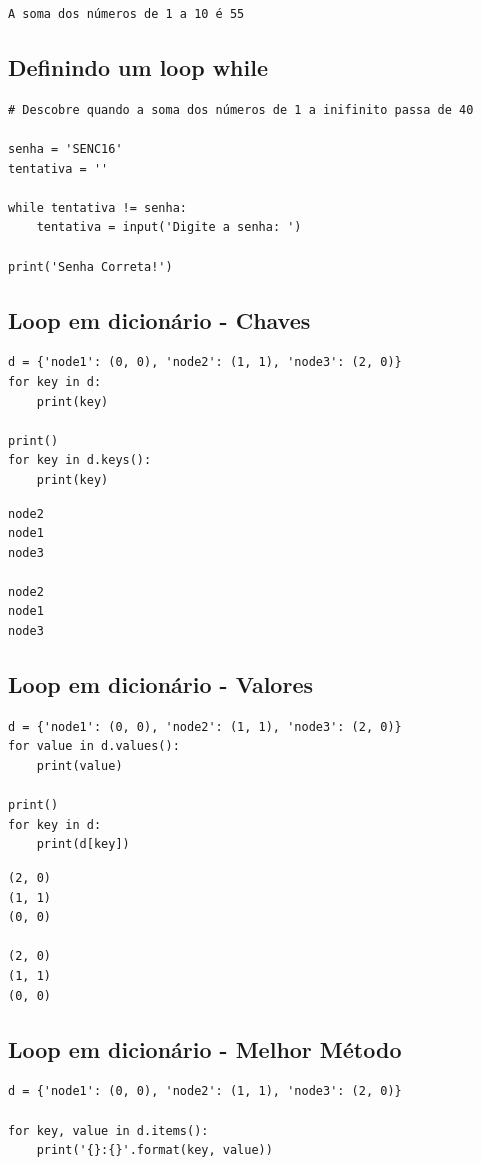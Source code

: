 \documentclass[presentation]{beamer}
\begin{document}
\begin{verbatim}
A soma dos números de 1 a 10 é 55
\end{verbatim}

\subsection{Definindo um loop while}
\label{sec:orgheadline80}
\begin{verbatim}
# Descobre quando a soma dos números de 1 a inifinito passa de 40

senha = 'SENC16'
tentativa = ''

while tentativa != senha: 
    tentativa = input('Digite a senha: ')

print('Senha Correta!')
\end{verbatim}
\subsection{Loop em dicionário - Chaves}
\label{sec:orgheadline81}
\begin{verbatim}
d = {'node1': (0, 0), 'node2': (1, 1), 'node3': (2, 0)}
for key in d:
    print(key)

print()
for key in d.keys():
    print(key)
\end{verbatim}

\begin{verbatim}
node2
node1
node3

node2
node1
node3
\end{verbatim}
\subsection{Loop em dicionário - Valores}
\label{sec:orgheadline82}
\begin{verbatim}
d = {'node1': (0, 0), 'node2': (1, 1), 'node3': (2, 0)}
for value in d.values():
    print(value)

print()
for key in d:
    print(d[key])
\end{verbatim}

\begin{verbatim}
(2, 0)
(1, 1)
(0, 0)

(2, 0)
(1, 1)
(0, 0)
\end{verbatim}

\subsection{Loop em dicionário - Melhor Método}
\label{sec:orgheadline83}
\begin{verbatim}
d = {'node1': (0, 0), 'node2': (1, 1), 'node3': (2, 0)}

for key, value in d.items():
    print('{}:{}'.format(key, value))
\end{verbatim}
\end{document}
